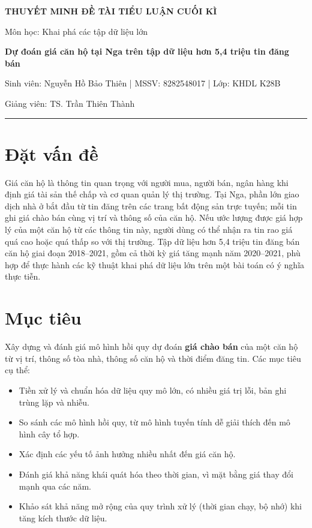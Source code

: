 \documentclass[12pt,a4paper]{article}
\begin{document}
\begin{center}
  {\fontsize{14}{17}\selectfont\bfseries THUYẾT MINH ĐỀ TÀI TIỂU LUẬN CUỐI KÌ\par}
  \vspace{2pt}
  Môn học: Khai phá các tập dữ liệu lớn\par
  \vspace{4pt}
  {\fontsize{13}{16}\selectfont\bfseries Dự đoán giá căn hộ tại Nga trên tập dữ liệu hơn 5,4 triệu tin đăng bán\par}
  \vspace{4pt}
  {\small Sinh viên: Nguyễn Hồ Bảo Thiên \;|\; MSSV: 8282548017 \;|\; Lớp: KHDL K28B\par}
  {\small Giảng viên: TS. Trần Thiên Thành\par}
  \vspace{-2pt}
  \rule{\textwidth}{0.4pt}
\end{center}

\section{Đặt vấn đề}
Giá căn hộ là thông tin quan trọng với người mua, người bán, ngân hàng khi định giá tài sản thế chấp và cơ quan quản lý thị trường. Tại Nga, phần lớn giao dịch nhà ở bắt đầu từ tin đăng trên các trang bất động sản trực tuyến; mỗi tin ghi giá chào bán cùng vị trí và thông số của căn hộ. Nếu ước lượng được giá hợp lý của một căn hộ từ các thông tin này, người dùng có thể nhận ra tin rao giá quá cao hoặc quá thấp so với thị trường. Tập dữ liệu hơn 5,4 triệu tin đăng bán căn hộ giai đoạn 2018--2021, gồm cả thời kỳ giá tăng mạnh năm 2020--2021, phù hợp để thực hành các kỹ thuật khai phá dữ liệu lớn trên một bài toán có ý nghĩa thực tiễn.

\section{Mục tiêu}
Xây dựng và đánh giá mô hình hồi quy dự đoán \textbf{giá chào bán} của một căn hộ từ vị trí, thông số tòa nhà, thông số căn hộ và thời điểm đăng tin. Các mục tiêu cụ thể:
\begin{itemize}
  \item Tiền xử lý và chuẩn hóa dữ liệu quy mô lớn, có nhiều giá trị lỗi, bản ghi trùng lặp và nhiễu.
  \item So sánh các mô hình hồi quy, từ mô hình tuyến tính dễ giải thích đến mô hình cây tổ hợp.
  \item Xác định các yếu tố ảnh hưởng nhiều nhất đến giá căn hộ.
  \item Đánh giá khả năng khái quát hóa theo thời gian, vì mặt bằng giá thay đổi mạnh qua các năm.
  \item Khảo sát khả năng mở rộng của quy trình xử lý (thời gian chạy, bộ nhớ) khi tăng kích thước dữ liệu.
\end{itemize}
\end{document}
